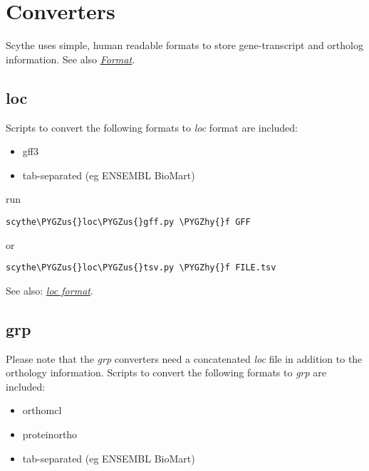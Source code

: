 \documentclass[letterpaper,10pt,english]{sphinxmanual}
\def\PYGZus{\char`\_}
\def\PYGZhy{\char`\-}
\begin{document}
\chapter{Converters}
\label{Converters::doc}\label{Converters:converters}\label{Converters:id1}
Scythe uses simple, human readable  formats to store gene-transcript and ortholog information.
See also {\hyperref[Format:format]{\emph{Format}}}.


\section{loc}
\label{Converters:loc}
Scripts to convert the following formats to \emph{loc} format are included:
\begin{itemize}
\item {} 
gff3

\item {} 
tab-separated (eg ENSEMBL BioMart)

\end{itemize}

run

\begin{Verbatim}[commandchars=\\\{\}]
scythe\PYGZus{}loc\PYGZus{}gff.py \PYGZhy{}f GFF
\end{Verbatim}

or

\begin{Verbatim}[commandchars=\\\{\}]
scythe\PYGZus{}loc\PYGZus{}tsv.py \PYGZhy{}f FILE.tsv
\end{Verbatim}

See also: {\hyperref[Format:loc-format]{\emph{loc format}}}.


\section{grp}
\label{Converters:grp}
Please note that the \emph{grp} converters  need a concatenated \emph{loc} file in addition to the orthology information.
Scripts to convert the following formats to \emph{grp} are included:
\begin{itemize}
\item {} 
orthomcl

\item {} 
proteinortho

\item {} 
tab-separated (eg ENSEMBL BioMart)

\end{itemize}
\end{document}
